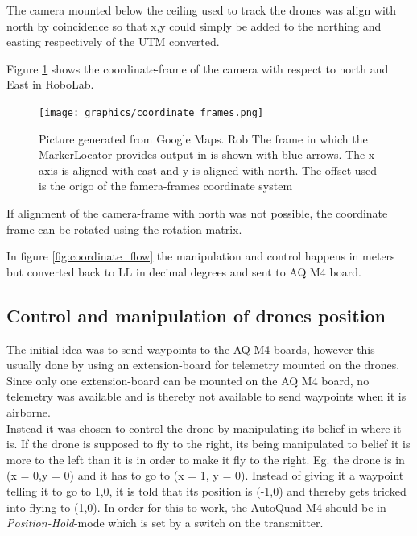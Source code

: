 The camera mounted below the ceiling used to track the drones was align with north by coincidence so that x,y could simply be added to the northing and easting respectively of the \ac{UTM} converted.

Figure \ref{fig:coordinate_frames} shows the coordinate-frame of the camera with respect to north and East in RoboLab.

\begin{figure}[H]
    \center
    \texttt{[image: graphics/coordinate\_frames.png]}
  	\caption{Picture generated from Google Maps. Rob The frame in which the MarkerLocator provides output in is shown with blue arrows. The x-axis is aligned with east and y is aligned with north. The offset used is the origo of the famera-frames coordinate system}
    \label{fig:coordinate_frames}
\end{figure}

If alignment of the camera-frame with north was not possible, the coordinate frame can be rotated using the rotation matrix\cite{Choset_2005_5167}.

In figure \ref{fig:coordinate_flow} the manipulation and control happens in meters but converted back to \ac{LL} in decimal degrees and sent to AQ M4 board.

\subsection{Control and manipulation of drones position}
The initial idea was to send waypoints to the AQ M4-boards, however this usually done by using an extension-board for telemetry mounted on the drones. Since only one extension-board can be mounted on the AQ M4 board, no telemetry was available and is thereby not available to send waypoints when it is airborne. \\
Instead it was chosen to control the drone by manipulating its belief in where it is.
If the drone is supposed to fly to the right, its being manipulated to belief it is more to the left than it is in order to make it fly to the right. Eg. the drone is in (x = 0,y = 0) and it has to go to (x = 1, y = 0).
Instead of giving it a waypoint telling it to go to 1,0, it is told that its position is (-1,0) and thereby gets tricked into flying to (1,0). In order for this to work, the AutoQuad M4 should be in \textit{Position-Hold}-mode which is set by a switch on the transmitter.

